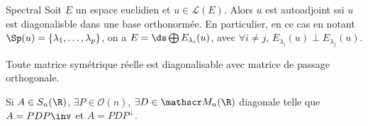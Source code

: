 \begin{theoreme}{Spectral}{}
    Soit $E$ un espace euclidien et $u \in \mathscr L(E)$. Alors $u$ est 
    autoadjoint ssi $u$ est diagonalisble dans une base orthonormée. 
    En particulier, en ce cas en notant $\Sp(u) = \{\lambda_1, \dots, \lambda_p\}$, on a 
    $E = \ds \bigoplus E_{\lambda_i} (u)$, avec $\forall i \neq j$, $E_{\lambda_i}(u) \perp E_{\lambda_j}(u)$. 
\end{theoreme}


Toute matrice symétrique réelle est diagonalisable avec matrice de passage orthogonale. 

Si $A \in S_n(\R)$, $\exists P \in \mathcal O(n)$, 
$\exists D \in \mathscr M_n(\R)$ diagonale telle que $A = PDP\inv$ et 
$A = PDP^\perp$. 

